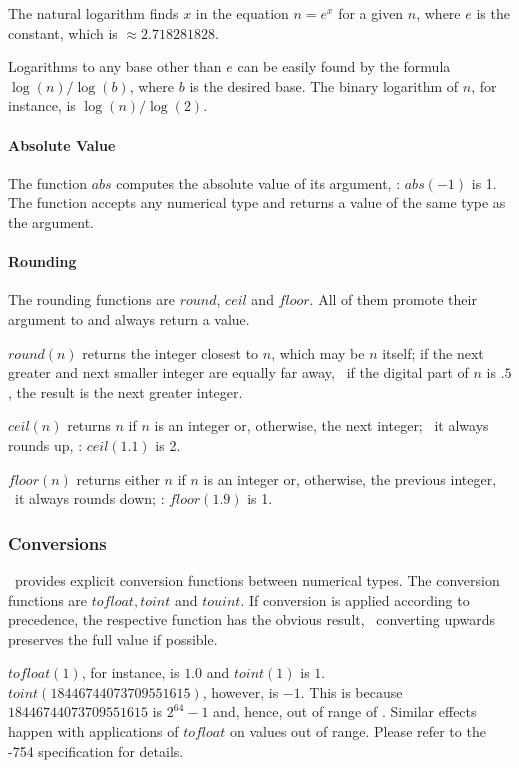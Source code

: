 The natural logarithm finds $x$ in the equation
$n=e^{x}$ for a given $n$, where $e$ is the
 constant, which is
$\approx 2.718281828$.

Logarithms to any base other than $e$
can be easily found by the formula
$\log(n)/\log(b)$, where $b$ is the
desired base. The binary logarithm
of $n$, for instance, is
$\log(n)/\log(2)$.

\paragraph{Absolute Value}
The function $abs$ computes the
absolute value of its argument, \eg:
$abs(-1)$ is 1.
The function accepts any numerical type
and returns a value of the same type as the argument.

\paragraph{Rounding}
The rounding functions are $round$, $ceil$ and $floor$.
All of them promote their argument to 
and always return a  value.

$round(n)$ returns the integer closest to $n$,
which may be $n$ itself; if the next greater and
next smaller integer are equally far away,
\ie\ if the digital part of $n$ is $.5$,
the result is the next greater integer.

$ceil(n)$ returns $n$ if $n$ is an integer or,
otherwise, the next integer;
\ie\ it always rounds up, \eg: $ceil(1.1)$ is 2.

$floor(n)$ returns either $n$ if $n$ is an integer
or, otherwise, the previous integer, \ie\ it always rounds down;
\eg: $floor(1.9)$ is 1.

\subsubsection{Conversions}
\nowdb\ provides explicit conversion functions
between numerical types. The conversion functions
are   
$tofloat, toint$ and $touint$.
If conversion is applied according to precedence,
the respective function has the obvious result,
\ie\ converting upwards preserves the full value
if possible.

$tofloat(1)$, for instance, is $1.0$ and
$toint(1)$ is $1$.
$toint(18446744073709551615)$, however, is $-1$.
This is because $18446744073709551615$ is
$2^{64}-1$ and, hence, out of range of .
Similar effects happen with applications of
$tofloat$ on values out of range.
Please refer to the 
-754 specification for details.

